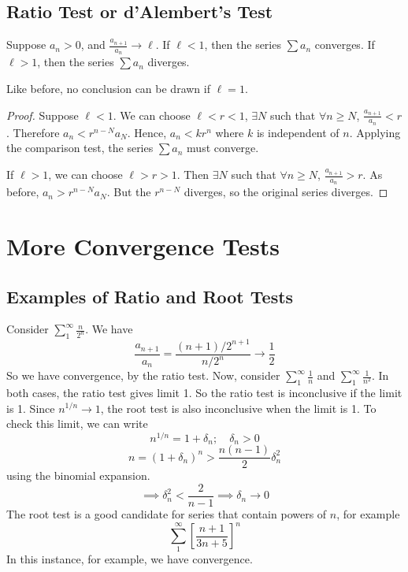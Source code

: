 \documentclass{article}
\begin{document}
\subsection{Ratio Test or d'Alembert's Test}
\begin{theorem}
    Suppose $a_n > 0$, and $\frac{a_{n+1}}{a_n} \to \ell$. If $\ell < 1$, then the series $\sum a_n$ converges. If $\ell > 1$, then the series $\sum a_n$ diverges.
\end{theorem}
\begin{remark}
    Like before, no conclusion can be drawn if $\ell = 1$.
\end{remark}
\begin{proof}
    Suppose $\ell < 1$. We can choose $\ell < r < 1$, $\exists N$ such that $\forall n \geq N$, $\frac{a_{n+1}}{a_n} < r$. Therefore $a_n < r^{n-N} a_N$. Hence, $a_n < k r^n$ where $k$ is independent of $n$. Applying the comparison test, the series $\sum a_n$ must converge.

    If $\ell > 1$, we can choose $\ell > r > 1$. Then $\exists N$ such that $\forall n \geq N$, $\frac{a_{n+1}}{a_n} > r$. As before, $a_n > r^{n-N} a_N$. But the $r^{n-N}$ diverges, so the original series diverges.
\end{proof}

\section{More Convergence Tests}
\subsection{Examples of Ratio and Root Tests}
Consider $\sum_1^\infty \frac{n}{2^n}$. We have
\[ \frac{a_{n+1}}{a_n} = \frac{(n+1)/2^{n+1}}{n/2^n} \to \frac{1}{2} \]
So we have convergence, by the ratio test. Now, consider $\sum_1^\infty \frac{1}{n}$ and $\sum_1^\infty \frac{1}{n^2}$. In both cases, the ratio test gives limit 1. So the ratio test is inconclusive if the limit is 1. Since $n^{1/n} \to 1$, the root test is also inconclusive when the limit is 1. To check this limit, we can write
\[ n^{1/n} = 1 + \delta_n;\quad \delta_n > 0 \]
\[ n = (1 + \delta_n)^n > \frac{n(n-1)}{2}\delta_n^2 \]
using the binomial expansion.
\[ \implies \delta_n^2 < \frac{2}{n-1} \implies \delta_n \to 0 \]
The root test is a good candidate for series that contain powers of $n$, for example
\[ \sum_1^\infty \left[ \frac{n+1}{3n+5} \right]^n \]
In this instance, for example, we have convergence.
\end{document}

